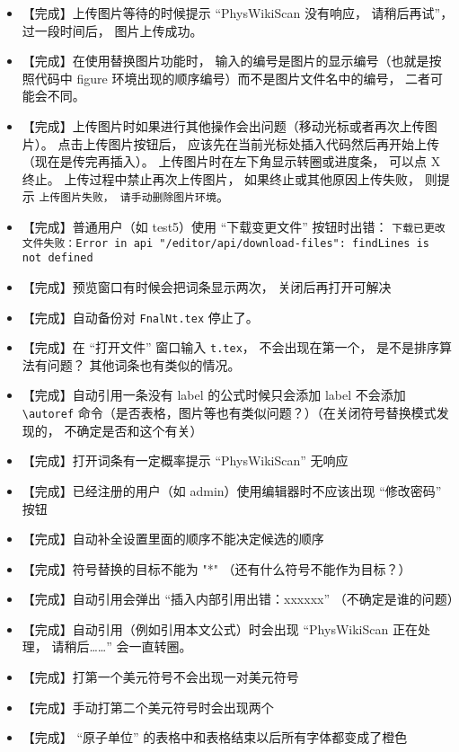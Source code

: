 \begin{itemize}
\item 【完成】上传图片等待的时候提示 “PhysWikiScan 没有响应， 请稍后再试”， 过一段时间后， 图片上传成功。

\item 【完成】在使用替换图片功能时， 输入的编号是图片的显示编号（也就是按照代码中 figure 环境出现的顺序编号）而不是图片文件名中的编号， 二者可能会不同。

\item 【完成】上传图片时如果进行其他操作会出问题（移动光标或者再次上传图片）。 点击上传图片按钮后， 应该先在当前光标处插入代码然后再开始上传（现在是传完再插入）。 上传图片时在左下角显示转圈或进度条， 可以点 X 终止。 上传过程中禁止再次上传图片， 如果终止或其他原因上传失败， 则提示 \verb|上传图片失败， 请手动删除图片环境|。

\item 【完成】普通用户（如 test5）使用 “下载变更文件” 按钮时出错： \verb|下载已更改文件失败：Error in api "/editor/api/download-files": findLines is not defined|

\item 【完成】预览窗口有时候会把词条显示两次， 关闭后再打开可解决

\item 【完成】自动备份对 \verb|FnalNt.tex| 停止了。

\item 【完成】在 “打开文件” 窗口输入 \lstinline|t.tex|， 不会出现在第一个， 是不是排序算法有问题？ 其他词条也有类似的情况。

\item 【完成】自动引用一条没有 label 的公式时候只会添加 label 不会添加 \lstinline|\autoref| 命令（是否表格，图片等也有类似问题？）（在关闭符号替换模式发现的， 不确定是否和这个有关）

\item 【完成】打开词条有一定概率提示 “PhysWikiScan” 无响应

\item 【完成】已经注册的用户（如 admin）使用编辑器时不应该出现 “修改密码” 按钮

\item 【完成】自动补全设置里面的顺序不能决定候选的顺序

\item 【完成】符号替换的目标不能为 "*" （还有什么符号不能作为目标？）

\item 【完成】自动引用会弹出 “插入内部引用出错：xxxxxx” （不确定是谁的问题）

\item 【完成】自动引用（例如引用本文公式）时会出现 “PhysWikiScan 正在处理， 请稍后……” 会一直转圈。

\item 【完成】打第一个美元符号不会出现一对美元符号

\item 【完成】手动打第二个美元符号时会出现两个

\item 【完成】 “原子单位” 的表格中和表格结束以后所有字体都变成了橙色
\end{itemize}

